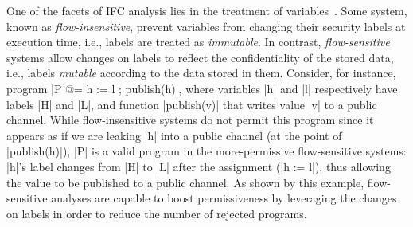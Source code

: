 One of the facets of IFC analysis lies in the treatment of
variables~\cite{Hunt:2006}. Some system, known as \emph{flow-insensitive},
prevent variables from changing their security labels at execution time, i.e., labels
are treated as \emph{immutable}. In contrast, \emph{flow-sensitive} systems
allow changes on labels to reflect the confidentiality of the stored data, i.e.,
labels \emph{mutable} according to the data stored in them.
Consider, for instance, program |P @= h := l ; publish(h)|, where variables |h| and |l| respectively have labels |H| and |L|, and
function |publish(v)| that writes value |v| to a public channel.
%
While flow-insensitive systems do not permit this program since it appears as if
we are leaking |h| into a public channel (at the point of |publish(h)|), |P| is
a valid program in the more-permissive flow-sensitive systems: |h|'s label
changes from |H| to |L| after the assignment (|h := l|), thus allowing the value
to be published to a public channel. As shown by this example, flow-sensitive
analyses are capable to boost permissiveness by leveraging the changes on labels
in order to reduce the number of
rejected programs. %





